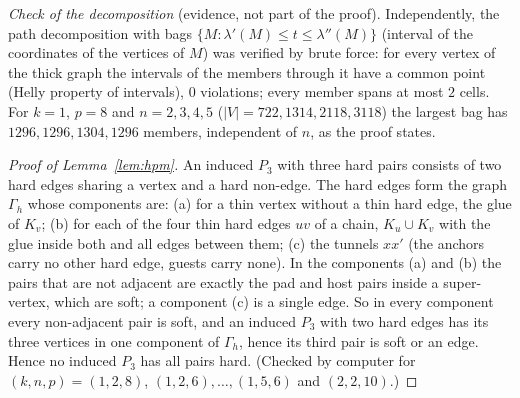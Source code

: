 \emph{Check of the decomposition} (evidence, not part of the proof). Independently, the path decomposition with bags $\{M:\lambda'(M)\le t\le\lambda''(M)\}$ (interval of the coordinates of the vertices of $M$) was verified by brute force: for every vertex of the thick graph the intervals of the members through it have a common point (Helly property of intervals), $0$ violations; every member spans at most $2$ cells. For $k=1$, $p=8$ and $n=2,3,4,5$ ($|V|=722,1314,2118,3118$) the largest bag has $1296,1296,1304,1296$ members, independent of $n$, as the proof states.
\begin{proof}[Proof of Lemma~\ref{lem:hpm}]
An induced $P_3$ with three hard pairs consists of two hard edges sharing a vertex and a hard non-edge. The hard edges form the graph $\Gamma_h$ whose components are: (a) for a thin vertex without a thin hard edge, the glue of $K_v$; (b) for each of the four thin hard edges $uv$ of a chain, $K_u\cup K_v$ with the glue inside both and all edges between them; (c) the tunnels $xx'$ (the anchors carry no other hard edge, guests carry none). In the components (a) and (b) the pairs that are not adjacent are exactly the pad and host pairs inside a super-vertex, which are soft; a component (c) is a single edge. So in every component every non-adjacent pair is soft, and an induced $P_3$ with two hard edges has its three vertices in one component of $\Gamma_h$, hence its third pair is soft or an edge. Hence no induced $P_3$ has all pairs hard. (Checked by computer for $(k,n,p)=(1,2,8)$, $(1,2,6),\dots,(1,5,6)$ and $(2,2,10)$.)
\end{proof}
